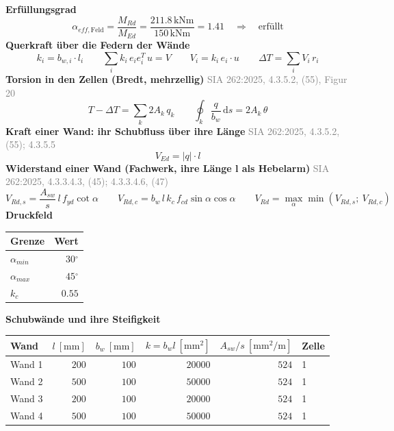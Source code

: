 \documentclass[11pt,a4paper]{article}
\newcommand{\normref}[1]{{\small\textcolor{gray}{#1}}}
\begin{document}
\noindent\textbf{Erfüllungsgrad}
\begin{equation*}
\alpha_{eff,\text{Feld}} = \frac{M_{Rd}}{M_{Ed}} = \frac{211.8\,\mathrm{kNm}}{150\,\mathrm{kNm}} = 1.41 \quad \Rightarrow \quad \text{erfüllt}
\end{equation*}
\noindent\textbf{Querkraft über die Federn der Wände}
\begin{equation*}
k_i = b_{w,i} \cdot l_i \qquad \sum_i k_i\, e_i e_i^T\, u = V \qquad V_i = k_i\, e_i \cdot u \qquad \Delta T = \sum_i V_i\, r_i
\end{equation*}
\noindent\textbf{Torsion in den Zellen (Bredt, mehrzellig)} \hfill \normref{SIA 262:2025, 4.3.5.2, (55), Figur 20}
\begin{equation*}
T - \Delta T = \sum_k 2 A_k\, q_k \qquad \oint_k \frac{q}{b_w}\, \mathrm{d}s = 2 A_k\, \theta
\end{equation*}
\noindent\textbf{Kraft einer Wand: ihr Schubfluss über ihre Länge} \hfill \normref{SIA 262:2025, 4.3.5.2, (55); 4.3.5.5}
\begin{equation*}
V_{Ed} = |q| \cdot l
\end{equation*}
\noindent\textbf{Widerstand einer Wand (Fachwerk, ihre Länge l als Hebelarm)} \hfill \normref{SIA 262:2025, 4.3.3.4.3, (45); 4.3.3.4.6, (47)}
\begin{equation*}
V_{Rd,s} = \frac{A_{sw}}{s}\, l\, f_{yd} \cot\alpha \qquad V_{Rd,c} = b_w\, l\, k_c\, f_{cd} \sin\alpha \cos\alpha \qquad V_{Rd} = \max_\alpha \min(V_{Rd,s};\ V_{Rd,c})
\end{equation*}
\noindent\textbf{Druckfeld}
\begin{longtable}{lr}
\hline
Grenze & Wert \\
\hline
\endhead
$\alpha_{min}$ & $30{}^{\circ}$ \\
$\alpha_{max}$ & $45{}^{\circ}$ \\
$k_c$ & $0.55$ \\
\hline
\end{longtable}
\noindent\textbf{Schubwände und ihre Steifigkeit}
\begin{longtable}{lrrrrl}
\hline
Wand & $l\ [\mathrm{mm}]$ & $b_w\ [\mathrm{mm}]$ & $k = b_w l\ [\mathrm{mm}^2]$ & $A_{sw}/s\ [\mathrm{mm^2/m}]$ & Zelle \\
\hline
\endhead
Wand 1 & $200$ & $100$ & $20000$ & $524$ & 1 \\
Wand 2 & $500$ & $100$ & $50000$ & $524$ & 1 \\
Wand 3 & $200$ & $100$ & $20000$ & $524$ & 1 \\
Wand 4 & $500$ & $100$ & $50000$ & $524$ & 1 \\
\hline
\end{longtable}
\end{document}
